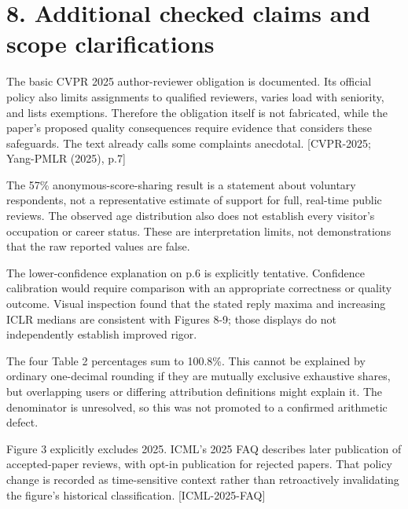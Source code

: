 \documentclass[10pt]{article}
\begin{document}
\section*{8. Additional checked claims and scope clarifications}
The basic CVPR 2025 author-reviewer obligation is documented. Its official policy also limits assignments to qualified reviewers, varies load with seniority, and lists exemptions. Therefore the obligation itself is not fabricated, while the paper’s proposed quality consequences require evidence that considers these safeguards. The text already calls some complaints anecdotal. [CVPR-2025; Yang-PMLR (2025), p.7]\par
The 57\% anonymous-score-sharing result is a statement about voluntary respondents, not a representative estimate of support for full, real-time public reviews. The observed age distribution also does not establish every visitor’s occupation or career status. These are interpretation limits, not demonstrations that the raw reported values are false.\par
The lower-confidence explanation on p.6 is explicitly tentative. Confidence calibration would require comparison with an appropriate correctness or quality outcome. Visual inspection found that the stated reply maxima and increasing ICLR medians are consistent with Figures 8-9; those displays do not independently establish improved rigor.\par
The four Table 2 percentages sum to 100.8\%. This cannot be explained by ordinary one-decimal rounding if they are mutually exclusive exhaustive shares, but overlapping users or differing attribution definitions might explain it. The denominator is unresolved, so this was not promoted to a confirmed arithmetic defect.\par
Figure 3 explicitly excludes 2025. ICML’s 2025 FAQ describes later publication of accepted-paper reviews, with opt-in publication for rejected papers. That policy change is recorded as time-sensitive context rather than retroactively invalidating the figure’s historical classification. [ICML-2025-FAQ]\par
\end{document}
